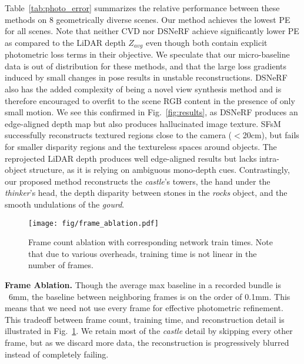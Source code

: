 Table~\ref{tab:photo_error} summarizes the relative performance between these methods on 8 geometrically diverse scenes. Our method achieves the lowest PE for all scenes. Note that neither CVD nor DSNeRF achieve significantly lower PE as compared to the LiDAR depth $Z_{avg}$ even though both contain explicit photometric loss terms in their objective. We speculate that our micro-baseline data is out of distribution for these methods, and that the large loss gradients induced by small changes in pose results in unstable reconstructions. DSNeRF also has the added complexity of being a novel view synthesis method and is therefore encouraged to overfit to the scene RGB content in the presence of only small motion. We see this confirmed in Fig.~\ref{fig:results}, as DSNeRF produces an edge-aligned depth map but also produces hallucinated image texture. SFsM successfully reconstructs textured regions close to the camera ($<$20cm), but fails for smaller disparity regions and the textureless spaces around objects. The reprojected LiDAR depth produces well edge-aligned results but lacks intra-object structure, as it is relying on ambiguous mono-depth cues. Contrastingly, our proposed method reconstructs the \emph{castle}'s towers, the hand under the \emph{thinker}'s head, the depth disparity between stones in the \emph{rocks} object, and the smooth undulations of the \emph{gourd}.

\begin{figure}[t]
    \centering
    \texttt{[image: fig/frame\_ablation.pdf]}
    \caption{Frame count ablation with corresponding network train times. Note that due to various overheads, training time is not linear in the number of frames.}
    \label{fig:frame-count}
    \vspace{-1em}
\end{figure}

\vspace{0.5em}\noindent\textbf{Frame Ablation.}\hspace{0.1em} Though the average max baseline in a recorded bundle is ~6mm, the baseline between neighboring frames is on the order of 0.1mm. This means that we need not use every frame for effective photometric refinement. This tradeoff between frame count, training time, and reconstruction detail is illustrated in Fig.~\ref{fig:frame-count}. We retain most of the \emph{castle} detail by skipping every other frame, but as we discard more data, the reconstruction is progressively blurred instead of completely failing.


